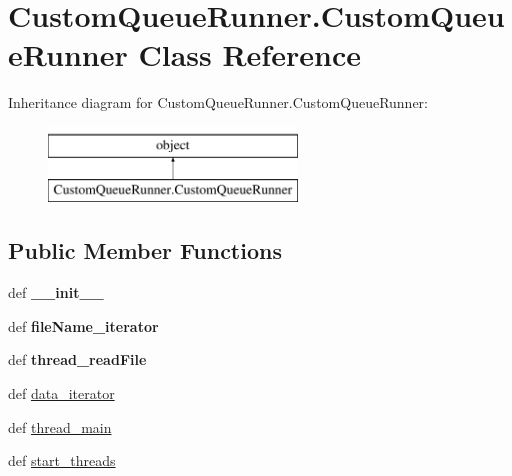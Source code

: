 \hypertarget{classCustomQueueRunner_1_1CustomQueueRunner}{\section{Custom\-Queue\-Runner.\-Custom\-Queue\-Runner Class Reference}
\label{classCustomQueueRunner_1_1CustomQueueRunner}
}
Inheritance diagram for Custom\-Queue\-Runner.\-Custom\-Queue\-Runner\-:\begin{figure}[H]
\begin{center}
\leavevmode
\includegraphics[height=2.000000cm]{classCustomQueueRunner_1_1CustomQueueRunner}
\end{center}
\end{figure}
\subsection*{Public Member Functions}
\begin{DoxyCompactItemize}
\item 
\hypertarget{classCustomQueueRunner_1_1CustomQueueRunner_af76d3fec912865bf7d94701af4e7c068}{def {\bfseries \-\_\-\-\_\-init\-\_\-\-\_\-}}\label{classCustomQueueRunner_1_1CustomQueueRunner_af76d3fec912865bf7d94701af4e7c068}

\item 
\hypertarget{classCustomQueueRunner_1_1CustomQueueRunner_a53f6b52ead2366c4c9982f7b0f76a8c9}{def {\bfseries file\-Name\-\_\-iterator}}\label{classCustomQueueRunner_1_1CustomQueueRunner_a53f6b52ead2366c4c9982f7b0f76a8c9}

\item 
\hypertarget{classCustomQueueRunner_1_1CustomQueueRunner_a597a93bdb86013eed4892c0722d3a313}{def {\bfseries thread\-\_\-read\-File}}\label{classCustomQueueRunner_1_1CustomQueueRunner_a597a93bdb86013eed4892c0722d3a313}

\item 
def \hyperlink{classCustomQueueRunner_1_1CustomQueueRunner_aa15d0ce6375f74387b8b85f28356bd8c}{data\-\_\-iterator}
\item 
def \hyperlink{classCustomQueueRunner_1_1CustomQueueRunner_a9146cfaf42a1bcd9b5511fb99a2c7115}{thread\-\_\-main}
\item 
def \hyperlink{classCustomQueueRunner_1_1CustomQueueRunner_ad43f2e2230cba3ee0e1162eafc763ccd}{start\-\_\-threads}
\end{DoxyCompactItemize}

